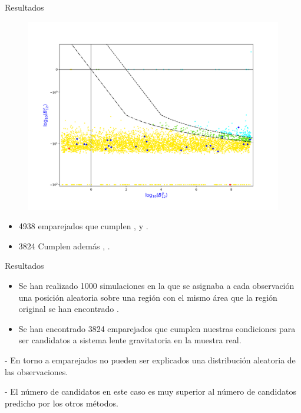 \documentclass[8pt]{beamer}
\begin{document}
\begin{frame}{Resultados}

\vspace{-5mm}

\begin{figure}[htb]
\centering
\includegraphics[scale=0.3]{matching_ghfactor_bayes_log_semilog.png}\par
\end{figure} 

\vspace{-5mm}
\begin{itemize}
    \item \small{4938 emparejados que cumplen ,  y .}
    
    \item 3824 Cumplen además , .
\end{itemize}

\end{frame}


\begin{frame}{Resultados}

\begin{itemize}

    \item Se han realizado 1000 simulaciones en la que se asignaba a cada observación una posición aleatoria sobre una región con el mismo área que la región original se han encontrado .
    
    \item Se han encontrado 3824 emparejados que cumplen nuestras condiciones para ser candidatos a sistema lente gravitatoria en la muestra real.
    
\end{itemize}

- En torno a  emparejados no pueden ser explicados una distribución aleatoria de las observaciones.

- El número de candidatos en este caso es muy superior al número de candidatos predicho por los otros métodos.

\end{frame}
\end{document}
